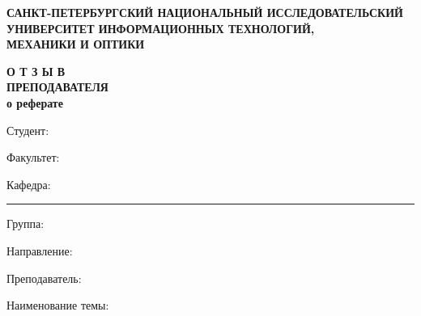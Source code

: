 \thispagestyle{empty}


\begin{center}
\textbf{САНКТ-ПЕТЕРБУРГСКИЙ НАЦИОНАЛЬНЫЙ ИССЛЕДОВАТЕЛЬСКИЙ\\ УНИВЕРСИТЕТ ИНФОРМАЦИОННЫХ ТЕХНОЛОГИЙ, \\МЕХАНИКИ И ОПТИКИ}


\textbf{О Т З Ы В
\\
	ПРЕПОДАВАТЕЛЯ\\
	о реферате
}
\end{center}

Студент:  

Факультет: 

Кафедра: \rule{10em}{.1pt} Группа: 

Направление:  

Преподаватель: 

Наименование темы: 

\hrulefill

\hrulefill

